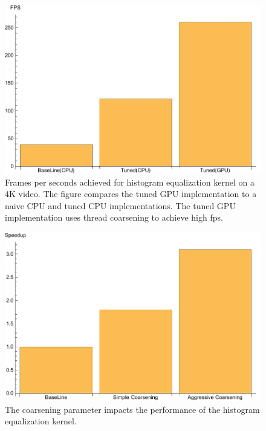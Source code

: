 \begin{figure}
\centering
\includegraphics[scale=0.5]{data/histogram.pdf}
\caption{Frames per seconds achieved for histogram equalization kernel on a 4K video. The figure compares the tuned GPU implementation to a naive CPU and tuned CPU implementations. The tuned GPU implementation uses thread coarsening to achieve high fps.}
\label{fig:histogram}
\centering
\end{figure}


\begin{figure}
\centering
\includegraphics[scale=0.5]{data/histogramc.pdf}
\caption{The coarsening parameter impacts the performance of the histogram equalization kernel.}
\label{fig:histogramCoarsining}
\centering
\end{figure}
